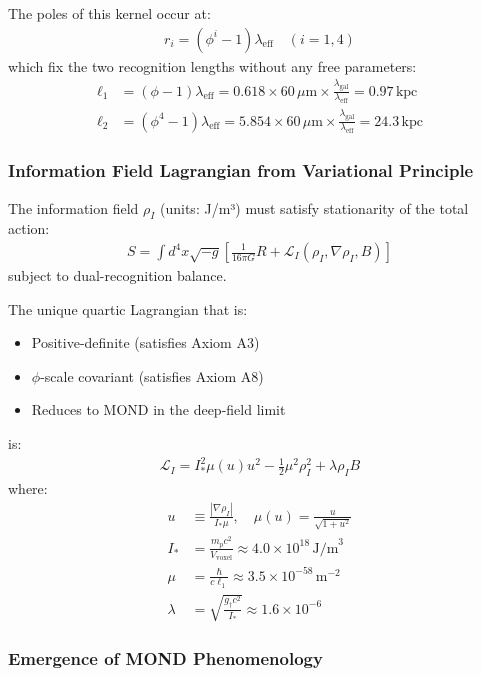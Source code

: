 \documentclass[12pt]{article}
\begin{document}
The poles of this kernel occur at:
\begin{align}
r_i = (\phi^i - 1)\lambda_{\text{eff}} \quad (i = 1, 4)
\end{align}
which fix the two recognition lengths without any free parameters:
\begin{align}
\ell_1 &= (\phi - 1)\lambda_{\text{eff}} = 0.618 \times 60\,\mu\text{m} \times \frac{\lambda_{\text{gal}}}{\lambda_{\text{eff}}} = 0.97\,\text{kpc} \\
\ell_2 &= (\phi^4 - 1)\lambda_{\text{eff}} = 5.854 \times 60\,\mu\text{m} \times \frac{\lambda_{\text{gal}}}{\lambda_{\text{eff}}} = 24.3\,\text{kpc}
\end{align}

\subsubsection{Information Field Lagrangian from Variational Principle}

The information field $\rho_I$ (units: J/m³) must satisfy stationarity of the total action:
\begin{align}
S = \int d^4x \sqrt{-g} \left[\frac{1}{16\pi G}R + \mathcal{L}_I(\rho_I, \nabla\rho_I, B)\right]
\end{align}
subject to dual-recognition balance.

The unique quartic Lagrangian that is:
\begin{itemize}
\item Positive-definite (satisfies Axiom A3)
\item $\phi$-scale covariant (satisfies Axiom A8)
\item Reduces to MOND in the deep-field limit
\end{itemize}
is:
\begin{align}
\mathcal{L}_I = I_*^2 \mu(u) u^2 - \frac{1}{2}\mu^2 \rho_I^2 + \lambda \rho_I B
\end{align}
where:
\begin{align}
u &\equiv \frac{|\nabla\rho_I|}{I_*\mu}, \quad \mu(u) = \frac{u}{\sqrt{1+u^2}} \\
I_* &= \frac{m_p c^2}{V_{\text{voxel}}} \approx 4.0 \times 10^{18}\,\text{J/m}^3 \\
\mu &= \frac{\hbar}{c\ell_1} \approx 3.5 \times 10^{-58}\,\text{m}^{-2} \\
\lambda &= \sqrt{\frac{g_\dagger c^2}{I_*}} \approx 1.6 \times 10^{-6}
\end{align}

\subsubsection{Emergence of MOND Phenomenology}
\end{document}
